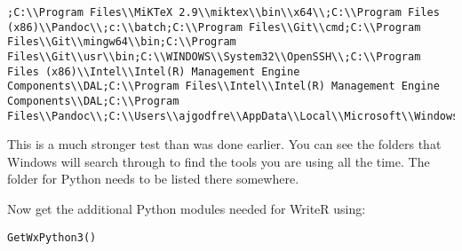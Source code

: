 \documentclass[
]{book}
\begin{document}
\begin{verbatim}
;C:\\Program Files\\MiKTeX 2.9\\miktex\\bin\\x64\\;C:\\Program Files (x86)\\Pandoc\\;c:\\batch;C:\\Program Files\\Git\\cmd;C:\\Program Files\\Git\\mingw64\\bin;C:\\Program Files\\Git\\usr\\bin;C:\\WINDOWS\\System32\\OpenSSH\\;C:\\Program Files (x86)\\Intel\\Intel(R) Management Engine Components\\DAL;C:\\Program Files\\Intel\\Intel(R) Management Engine Components\\DAL;C:\\Program Files\\Pandoc\\;C:\\Users\\ajgodfre\\AppData\\Local\\Microsoft\\WindowsApps;"
\end{verbatim}

This is a much stronger test than was done earlier. You can see the folders that Windows will search through to find the tools you are using all the time. The folder for Python needs to be listed there somewhere.

Now get the additional Python modules needed for WriteR using:

\texttt{GetWxPython3()}
\end{document}

